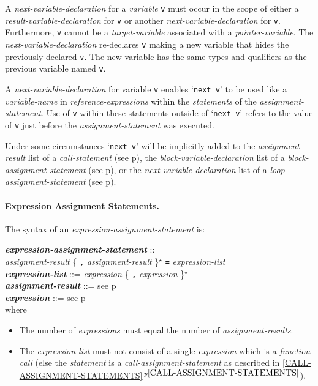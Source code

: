 \documentclass[12pt]{article}
\newcommand{\subsubsubsection}[1]{\paragraph[#1]{#1.}}
\newcommand{\TT}[1]{{\tt \bfseries #1}}
\newcommand{\STAR}{{\Large $^\star$}}
\newcommand{\emkey}[1]{{\em \bfseries #1}}
\newcommand{\itemref}[1]{\ref{#1}$\,^{p\pageref{#1}}$}
\newcommand{\pagref}[1]{p\pageref{#1}}
\newenvironment{indpar}[1][0.3in]%
	{\begin{list}{}%
		     {\setlength{\itemsep}{0in}%
		      \setlength{\topsep}{0in}%
		      \setlength{\parsep}{1ex}%
		      \setlength{\labelwidth}{#1}%
		      \setlength{\leftmargin}{#1}%
		      \addtolength{\leftmargin}{\labelsep}}%
	 \item}%
	{\end{list}}
\begin{document}
A {\em next-variable-declaration} for a {\em variable} {\tt v}
must occur in the scope of either a {\em result-variable-declaration}
for {\tt v} or another {\em next-variable-declaration} for {\tt v}.
Furthermore, {\tt v} cannot be a {\em target-variable} associated
with a {\em pointer-variable}.
The {\em next-variable-declaration} re-declares {\tt v} making a new
variable that hides the previously declared {\tt v}.  The new variable
has the same types and qualifiers as the previous variable named {\tt v}.

A {\em next-variable-declaration} for variable {\tt v} enables
`{\tt next v}' to be used like a {\em variable-name}
in {\em reference-expressions} within the {\em statements}
of the {\em assignment-statement}.  Use of
{\tt v} within these statements outside of `{\tt next v}'
refers to the value of {\tt v} just
before the {\em assignment-statement} was executed.

Under some circumstances `{\tt next v}' will
be implicitly added to the {\em assignment-result}
list of a {\em call-statement} (see \pagref{CALL-NEXT-PROMOTION}),
the {\em block-variable-declaration} list
of a {\em block-assignment-statement} (see \pagref{BLOCK-NEXT-PROMOTION}),
or the {\em next-variable-declaration} list of a
{\em loop-assignment-statement} (see \pagref{LOOP-NEXT-PROMOTION}).

\subsubsubsection{Expression Assignment Statements}
\label{EXPRESSION-ASSIGNMENT-STATEMENTS}

The syntax of an {\em expression-assign\-ment-statement} is:
\begin{indpar}
\emkey{expression-assignment-statement} ::= \\
\hspace*{0.5in} {\em assignment-result}
                \{ \TT{,} {\em assignment-result} \}\STAR{}
		\TT{=} {\em expression-list}
\\[0.5ex]
\emkey{expression-list}\label{EXPRESSION-LIST} ::=
	      {\em expression} \{ \TT{,} {\em expression} \}\STAR{}
\\[0.5ex]
\emkey{assignment-result} ::= see \pagref{ASSIGNMENT-RESULT}
\\[0.5ex]
\emkey{expression} ::= see \pagref{EXPRESSION}
\\[2.0ex]
where
\begin{itemize}

\item The number of {\em expressions} must equal the number
of {\em assignment-results}.

\item The {\em expression-list} must not consist of a single
{\em expression} which is a {\em function-call} (else the
{\em statement} is a {\em call-assignment-statement} as described in
\itemref{CALL-ASSIGNMENT-STATEMENTS}).

\end{itemize}
\end{indpar}
\end{document}
